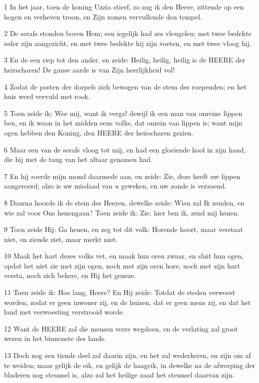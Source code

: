 \par 1 In het jaar, toen de koning Uzzia stierf, zo zag ik den Heere, zittende op een hogen en verheven troon, en Zijn zomen vervullende den tempel.
\par 2 De serafs stonden boven Hem; een iegelijk had zes vleugelen; met twee bedekte ieder zijn aangezicht, en met twee bedekte hij zijn voeten, en met twee vloog hij.
\par 3 En de een riep tot den ander, en zeide: Heilig, heilig, heilig is de HEERE der heirscharen! De ganse aarde is van Zijn heerlijkheid vol!
\par 4 Zodat de posten der dorpels zich bewogen van de stem des roependen; en het huis werd vervuld met rook.
\par 5 Toen zeide ik: Wee mij, want ik verga! dewijl ik een man van onreine lippen ben, en ik woon in het midden eens volks, dat onrein van lippen is; want mijn ogen hebben den Koning, den HEERE der heirscharen gezien.
\par 6 Maar een van de serafs vloog tot mij, en had een gloeiende kool in zijn hand, die hij met de tang van het altaar genomen had.
\par 7 En hij roerde mijn mond daarmede aan, en zeide: Zie, deze heeft uw lippen aangeroerd; alzo is uw misdaad van u geweken, en uw zonde is verzoend.
\par 8 Daarna hoorde ik de stem des Heeren, dewelke zeide: Wien zal Ik zenden, en wie zal voor Ons henengaan? Toen zeide ik: Zie, hier ben ik, zend mij henen.
\par 9 Toen zeide Hij: Ga henen, en zeg tot dit volk: Horende hoort, maar verstaat niet, en ziende ziet, maar merkt niet.
\par 10 Maak het hart dezes volks vet, en maak hun oren zwaar, en sluit hun ogen, opdat het niet zie met zijn ogen, noch met zijn oren hore, noch met zijn hart versta, noch zich bekere, en Hij het geneze.
\par 11 Toen zeide ik: Hoe lang, Heere? En Hij zeide: Totdat de steden verwoest worden, zodat er geen inwoner zij, en de huizen, dat er geen mens zij, en dat het land met verwoesting verstrooid worde.
\par 12 Want de HEERE zal die mensen verre wegdoen, en de verlating zal groot wezen in het binnenste des lands.
\par 13 Doch nog een tiende deel zal daarin zijn, en het zal wederkeren, en zijn om af te weiden; maar gelijk de eik, en gelijk de haageik, in dewelke na de afwerping der bladeren nog steunsel is, alzo zal het heilige zaad het steunsel daarvan zijn.

